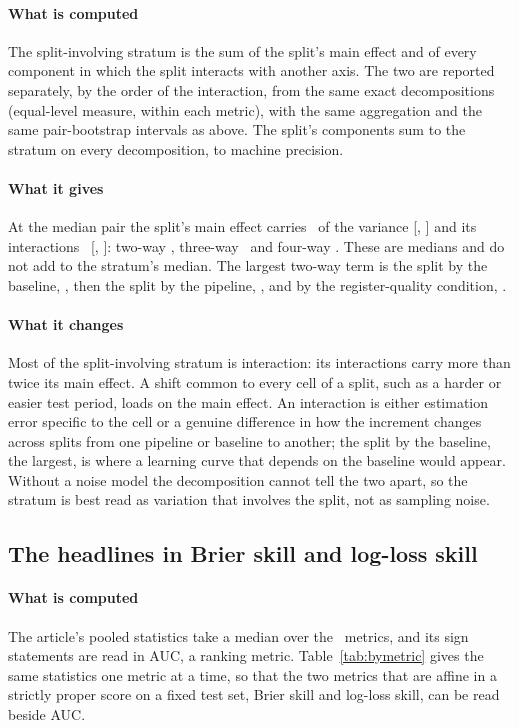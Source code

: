 \paragraph{What is computed}
The split-involving stratum is the sum of the split's main effect and of
every component in which the split interacts with another axis. The two are
reported separately, by the order of the interaction, from the same exact
decompositions (equal-level measure, within each metric), with the same
aggregation and the same pair-bootstrap intervals as above. The split's
components sum to the stratum on every decomposition, to machine precision.

\paragraph{What it gives}
At the median pair the split's main effect carries \splitMainPct\ of the
variance [\splitMainLoPct, \splitMainHiPct] and its interactions
\splitInteractionsPct\ [\splitInteractionsLoPct, \splitInteractionsHiPct]:
two-way \splitTwoWayPct, three-way \splitThreeWayPct\ and four-way
\splitFourWayPct. These are medians and do not add to the stratum's median.
The largest two-way term is the split by the baseline, \splitRungPct, then the
split by the pipeline, \splitLearnerPct, and by the register-quality
condition, \splitQualityPct.

\paragraph{What it changes}
Most of the split-involving stratum is interaction: its interactions carry
more than twice its main effect. A shift common to every cell of a split, such
as a harder or easier test period, loads on the main effect. An interaction
is either estimation error specific to the cell or a genuine difference in
how the increment changes across splits from one pipeline or baseline to
another; the split by the baseline, the largest, is where a learning curve that
depends on the baseline would appear. Without a noise model the
decomposition cannot tell the two apart, so the stratum is best read as
variation that involves the split, not as sampling noise.

\subsection{The headlines in Brier skill and log-loss skill}
\label{app:ijf-proper}

\paragraph{What is computed}
The article's pooled statistics take a median over the \nInstruments\
metrics, and its sign statements are read in AUC, a ranking metric.
Table~\ref{tab:bymetric} gives the same statistics one metric at a time, so
that the two metrics that are affine in a strictly proper score on a fixed
test set, Brier skill and log-loss skill, can be read beside AUC.

